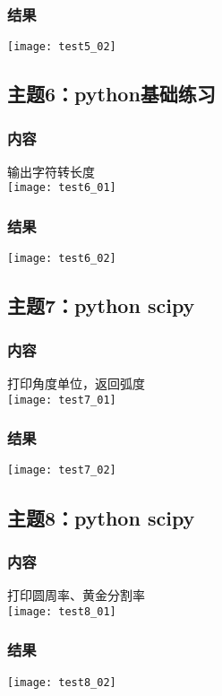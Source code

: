 \documentclass{article}
\begin{document}
\subsubsection{结果}  
\texttt{[image: test5\_02]}\\
\vspace{1cm}
\subsection{主题6：python基础练习}  
\subsubsection{内容}
输出字符转长度\\
\texttt{[image: test6\_01]}\\
\subsubsection{结果}  
\texttt{[image: test6\_02]}\\
\vspace{1cm}
\subsection{主题7：python scipy}  
\subsubsection{内容}
打印角度单位，返回弧度\\
\texttt{[image: test7\_01]}\\
\subsubsection{结果}  
\texttt{[image: test7\_02]}\\
\newpage
\thispagestyle{empty}
\subsection{主题8：python scipy}  
\subsubsection{内容}
打印圆周率、黄金分割率\\
\texttt{[image: test8\_01]}\\
\subsubsection{结果}  
\texttt{[image: test8\_02]}\\
\vspace{1cm}
\end{document}
